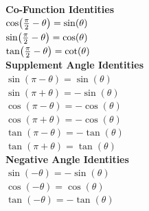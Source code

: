 \documentclass[11pt]{article}
\begin{document}
  \begin{multicols}{2}
  \textbf{Co-Function Identities} \\
  \({\cos}{\left( \frac{\pi}{2} - \theta \right)} = \sin(\theta)\)\vspace{6pt} \\
  \({\sin}{\left( \frac{\pi}{2} - \theta \right)} = \cos(\theta)\) \vspace{6pt} \\
  \({\tan}{\left( \frac{\pi}{2} - \theta \right)} = \cot(\theta)\) \\

  \textbf{Supplement Angle Identities} \\
  \(\sin(\pi - \theta) = \sin(\theta)\) \\
  \(\sin(\pi + \theta) = -\sin(\theta)\)\vspace{6pt} \\
  \(\cos(\pi - \theta) = -\cos(\theta)\) \\
  \(\cos(\pi + \theta) = -\cos(\theta)\)\vspace{6pt} \\
  \(\tan(\pi - \theta) = -\tan(\theta)\) \\
  \(\tan(\pi + \theta) = \tan(\theta)\) \\

  \textbf{Negative Angle Identities}\\
  \(\sin(-\theta) = -\sin(\theta)\) \vspace{6pt} \\
  \(\cos(-\theta) = \cos(\theta)\) \vspace{6pt} \\
  \(\tan(-\theta) = -\tan(\theta)\) \\


\end{multicols}
\end{document}
